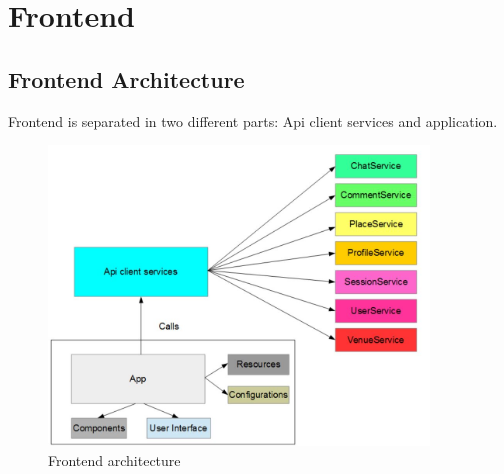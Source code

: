 \section{Frontend}
\label{sec:frontend}
\subsection{Frontend Architecture}
Frontend is separated in two different parts: Api client services and application.
\begin{figure}[htbp]
	\includegraphics[width=0.9\textwidth]{images/frontend_architecture.jpg}
	\centering
	\caption[]{Frontend architecture}
	\label{fig:frontend_architecture}
\end{figure}
